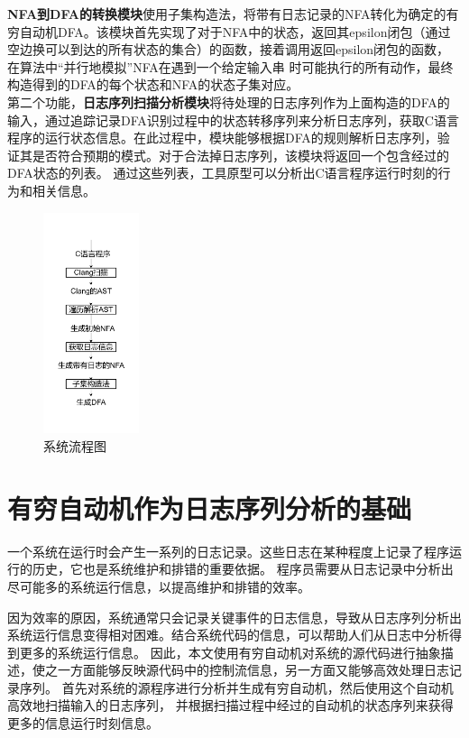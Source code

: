 \textbf{NFA到DFA的转换模块}使用子集构造法，将带有日志记录的NFA转化为确定的有穷自动机DFA。该模块首先实现了对于NFA中的状态，返回其epsilon闭包（通过空边换可以到达的所有状态的集合）的函数，接着调用返回epsilon闭包的函数，在算法中“并行地模拟”NFA在遇到一个给定输入串
时可能执行的所有动作，最终构造得到的DFA的每个状态和NFA的状态子集对应。\\


第二个功能，\textbf{日志序列扫描分析模块}将待处理的日志序列作为上面构造的DFA的输入，通过追踪记录DFA识别过程中的状态转移序列来分析日志序列，获取C语言程序的运行状态信息。在此过程中，模块能够根据DFA的规则解析日志序列，验证其是否符合预期的模式。对于合法掉日志序列，该模块将返回一个包含经过的DFA状态的列表。
通过这些列表，工具原型可以分析出C语言程序运行时刻的行为和相关信息。


\begin{figure}[htbp]
	\centering
	\includegraphics[width=0.25\textwidth]{pictures/系统流程图.pdf}
	\caption{系统流程图}
	\label{fig:系统流程图}
\end{figure}

\section{有穷自动机作为日志序列分析的基础}
一个系统在运行时会产生一系列的日志记录。这些日志在某种程度上记录了程序运行的历史，它也是系统维护和排错的重要依据。
程序员需要从日志记录中分析出尽可能多的系统运行信息，以提高维护和排错的效率。

因为效率的原因，系统通常只会记录关键事件的日志信息，导致从日志序列分析出系统运行信息变得相对困难。结合系统代码的信息，可以帮助人们从日志中分析得到更多的系统运行信息。
因此，本文使用有穷自动机对系统的源代码进行抽象描述，使之一方面能够反映源代码中的控制流信息，另一方面又能够高效处理日志记录序列。
首先对系统的源程序进行分析并生成有穷自动机，然后使用这个自动机高效地扫描输入的日志序列，
并根据扫描过程中经过的自动机的状态序列来获得更多的信息运行时刻信息。

